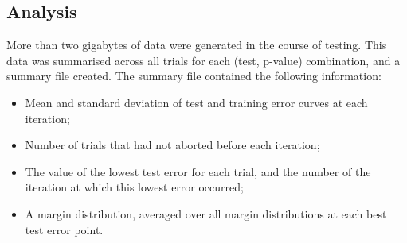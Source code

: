 \subsection{Analysis}

More than two gigabytes of data were generated in the course of
testing.  This data was summarised across all trials for each (test,
p-value) combination, and a summary file created.  The summary file
contained the following information:

\begin{itemize}
\item	Mean and standard deviation of test and training error curves
	at each iteration;
\item	Number of trials that had not aborted before each iteration;
\item	The value of the lowest test error for each trial, and the
	number of the iteration at which this lowest error occurred;
\item	A margin distribution, averaged over all margin distributions
	at each best test error point.
\end{itemize}





